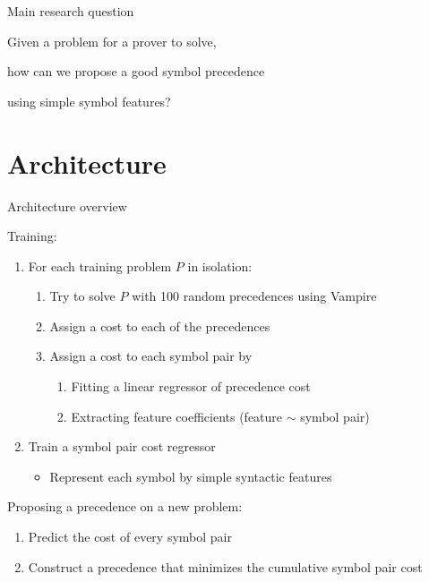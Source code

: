 \documentclass[notes]{beamer}
\begin{document}
\begin{frame}{Main research question}

\centering

Given a problem for a prover to solve,

how can we propose a good symbol precedence

using simple symbol features?

\end{frame}

\section{Architecture}

\begin{frame}{Architecture overview}

Training:
\begin{enumerate}
	\item For each training problem $P$ in isolation:
	\begin{enumerate}
		\item Try to solve $P$ with 100 random precedences using Vampire
		\item Assign a cost to each of the precedences%
		\item Assign a cost to each symbol pair by
		\begin{enumerate}
			\item Fitting a linear regressor of precedence cost
			\item Extracting feature coefficients (feature $\sim$ symbol pair)
		\end{enumerate}
	\end{enumerate}
	\item Train a symbol pair cost regressor
	\begin{itemize}
		\item Represent each symbol by simple syntactic features
	\end{itemize}
\end{enumerate}

\vspace{.5cm}

Proposing a precedence on a new problem:
\begin{enumerate}
	\item Predict the cost of every symbol pair
	\item Construct a precedence that minimizes the cumulative symbol pair cost
\end{enumerate}

\end{frame}
\end{document}
